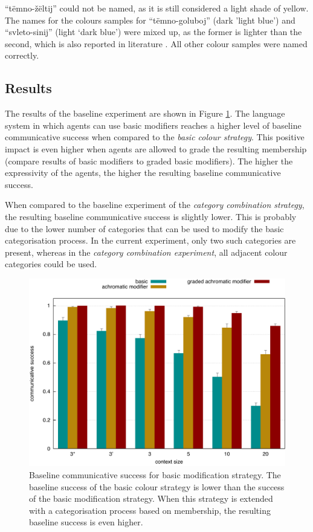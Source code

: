 ``t\"emno-\v z\"eltij'' could not be
named, as it is still considered a light shade of yellow. The names
for the colours samples for ``t\"emno-goluboj'' (dark 'light blue')
and ``svleto-sinij'' (light `dark blue') were mixed up, as the former
is lighter than the second, which is also reported in literature
\citep{safuanova07russian}. All other colour samples were named
correctly.

\subsection{Results}

The results of the baseline experiment are shown in Figure
\ref{f:ams-baseline}. The language system in which agents can use
basic modifiers reaches a higher level of baseline communicative
success when compared to the \emph{basic colour strategy}. This
positive impact is even higher when agents are allowed to grade the
resulting membership (compare results of basic modifiers to
graded basic modifiers). The higher the expressivity of the
agents, the higher the resulting baseline communicative success.

When compared to the baseline experiment of the \emph{category
  combination strategy}, the resulting baseline communicative success
is slightly lower. This is probably due to the lower number of
categories that can be used to modify the basic categorisation
process. In the current experiment, only two such categories are
present, whereas in the \emph{category combination experiment}, all
adjacent colour categories could be used.

\begin{figure}[htpb]
  \centering
  \includegraphics[width=\textwidth]{./achromatic/figures/baseline.pdf}
  \caption[Baseline communicative success for basic modification
  strategy]{Baseline communicative success for basic modification
    strategy. The baseline success of the basic colour strategy is
    lower than the success of the basic modification strategy. When
    this strategy is extended with a categorisation process based on
    membership, the resulting baseline success is even higher.}
  \label{f:ams-baseline}
\end{figure}

